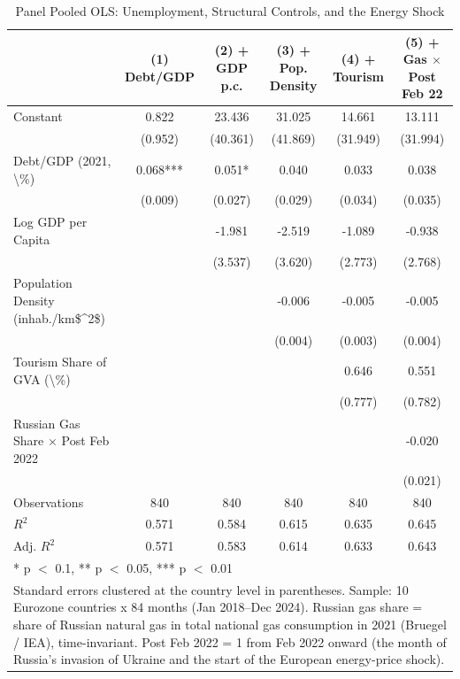 \begin{table}
\centering
\caption{Panel Pooled OLS: Unemployment, Structural Controls, and the Energy Shock \label{tab:ols}}
\centering
\begin{tabular}[t]{lccccc}
\toprule
  & (1) Debt/GDP & (2) + GDP p.c. & (3) + Pop. Density & (4) + Tourism & (5) + Gas $\times$ Post Feb 22\\
\midrule
Constant & 0.822 & 23.436 & 31.025 & 14.661 & 13.111\\
 & (0.952) & (40.361) & (41.869) & (31.949) & (31.994)\\
Debt/GDP (2021, \textbackslash{}\%) & 0.068*** & 0.051* & 0.040 & 0.033 & 0.038\\
 & (0.009) & (0.027) & (0.029) & (0.034) & (0.035)\\
Log GDP per Capita &  & -1.981 & -2.519 & -1.089 & -0.938\\
 &  & (3.537) & (3.620) & (2.773) & (2.768)\\
Population Density (inhab./km\$\textasciicircum{}2\$) &  &  & -0.006 & -0.005 & -0.005\\
 &  &  & (0.004) & (0.003) & (0.004)\\
Tourism Share of GVA (\textbackslash{}\%) &  &  &  & 0.646 & 0.551\\
 &  &  &  & (0.777) & (0.782)\\
Russian Gas Share $\times$ Post Feb 2022 &  &  &  &  & -0.020\\
 &  &  &  &  & (0.021)\\
\midrule
Observations & 840 & 840 & 840 & 840 & 840\\
$R^2$ & 0.571 & 0.584 & 0.615 & 0.635 & 0.645\\
Adj. $R^2$ & 0.571 & 0.583 & 0.614 & 0.633 & 0.643\\
\bottomrule
\multicolumn{6}{l}{\rule{0pt}{1em}* p $<$ 0.1, ** p $<$ 0.05, *** p $<$ 0.01}\\
\multicolumn{6}{l}{\rule{0pt}{1em}Standard errors clustered at the country level in parentheses. Sample: 10 Eurozone countries x 84 months (Jan 2018--Dec 2024). Russian gas share = share of Russian natural gas in total national gas consumption in 2021 (Bruegel / IEA), time-invariant. Post Feb 2022 = 1 from Feb 2022 onward (the month of Russia's invasion of Ukraine and the start of the European energy-price shock).}\\
\end{tabular}
\end{table}
